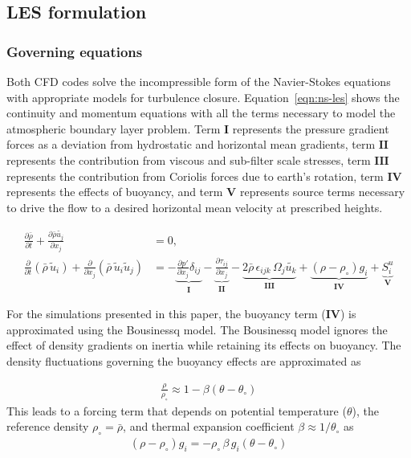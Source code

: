 \subsection{LES formulation}

\subsubsection{Governing equations}
Both CFD codes solve the incompressible form of the Navier-Stokes equations with
appropriate models for turbulence closure. Equation~\ref{eqn:ns-les} shows the
continuity and momentum equations with all the terms necessary to model the
atmospheric boundary layer problem. Term $\mathbf{I}$ represents the pressure
gradient forces as a deviation from hydrostatic and horizontal mean gradients,
term $\mathbf{II}$ represents the contribution from viscous and sub-filter scale
stresses, term $\mathbf{III}$ represents the contribution from Coriolis forces
due to earth's rotation, term $\mathbf{IV}$ represents the effects of buoyancy,
and term $\mathbf{V}$ represents source terms necessary to drive the flow to a
desired horizontal mean velocity at prescribed heights.

\begin{align}
  \frac{\partial \bar{\rho}} {\partial t} + \frac{\partial \bar{\rho} \widetilde{u_j}}{\partial x_j} & = 0, \nonumber\\
  \frac{\partial}{\partial t} \left(\bar{\rho}\, \widetilde{u}_i\right) +
  \frac{\partial}{\partial x_j} \left( \bar{\rho}\, \widetilde{u}_i \widetilde{u}_j \right) &=
  - \underbrace{\frac{\partial p'}{\partial x_j} \delta_{ij}}_\mathbf{I}
  - \underbrace{\frac{\partial \tau_{ij}}{\partial x_j}}_\mathbf{II}
  - \underbrace{2\bar{\rho}\,\epsilon_{ijk}\,\Omega_j\widetilde{u_k}}_\mathbf{III}
  + \underbrace{\left(\rho - \rho_\circ \right) g_i}_\mathbf{IV}
  + \underbrace{S^{u}_{i}}_\mathbf{V} \label{eqn:ns-les}
\end{align}

For the simulations presented in this paper, the buoyancy term ($\mathbf{IV}$)
is approximated using the Bousinessq model. The Bousinessq model ignores the
effect of density gradients on inertia while retaining its effects on buoyancy.
The density fluctuations governing the buoyancy effects are approximated as

\begin{align}
  \frac{\rho}{\rho_\circ} \approx 1 - \beta \left( \theta - \theta_\circ \right)
\end{align}
This leads to a forcing term that depends on potential temperature ($\theta$),
the reference density $\rho_\circ = \bar{\rho}$, and thermal expansion
coefficient $\beta \approx 1 / \theta_\circ$ as
\begin{align}
  \left(\rho - \rho_\circ \right) g_i = -\rho_\circ\, \beta\, g_i \left( \theta - \theta_\circ \right)
\end{align}

